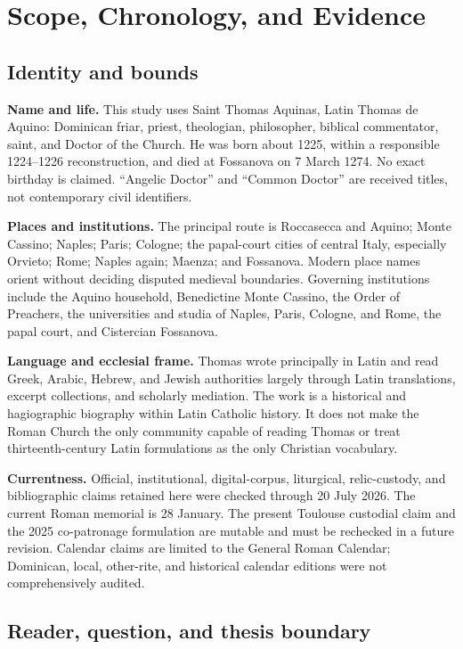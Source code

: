 \section{Scope, Chronology, and Evidence}
\label{sec:aquinas-apparatus}

\subsection{Identity and bounds}

\textbf{Name and life.} This study uses Saint Thomas Aquinas, Latin Thomas de
Aquino: Dominican friar, priest, theologian, philosopher, biblical commentator,
saint, and Doctor of the Church.  He was born about 1225, within a responsible
1224--1226 reconstruction, and died at Fossanova on 7 March 1274.  No exact
birthday is claimed.  ``Angelic Doctor'' and ``Common Doctor'' are received
titles, not contemporary civil identifiers.

\textbf{Places and institutions.} The principal route is Roccasecca and Aquino;
Monte Cassino; Naples; Paris; Cologne; the papal-court cities of central Italy,
especially Orvieto; Rome; Naples again; Maenza; and Fossanova.  Modern place
names orient without deciding disputed medieval boundaries.  Governing
institutions include the Aquino household, Benedictine Monte Cassino, the Order
of Preachers, the universities and studia of Naples, Paris, Cologne, and Rome,
the papal court, and Cistercian Fossanova.

\textbf{Language and ecclesial frame.} Thomas wrote principally in Latin and
read Greek, Arabic, Hebrew, and Jewish authorities largely through Latin
translations, excerpt collections, and scholarly mediation.  The work is a
historical and hagiographic biography within Latin Catholic history.  It does
not make the Roman Church the only community capable of reading Thomas or
treat thirteenth-century Latin formulations as the only Christian vocabulary.

\textbf{Currentness.} Official, institutional, digital-corpus, liturgical,
relic-custody, and bibliographic claims retained here were checked through 20
July 2026.  The current Roman memorial is 28 January.  The present Toulouse
custodial claim and the 2025 co-patronage formulation are mutable and must be
rechecked in a future revision.  Calendar claims are limited to the General
Roman Calendar; Dominican, local, other-rite, and historical calendar editions
were not comprehensively audited.

\subsection{Reader, question, and thesis boundary}

